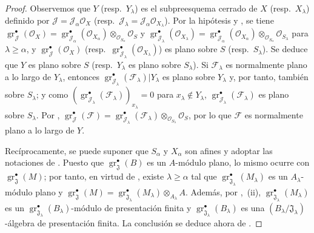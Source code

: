 \begin{proof}
Observemos que $Y$ (resp.\ $Y_\lambda$) es el subpreesquema cerrado de $X$ (resp.\ $X_\lambda$) definido por $\mathcal J=\mathcal J_\alpha\mathcal O_X$ (resp.\ $\mathcal J_\lambda=\mathcal J_\alpha\mathcal O_{X_\lambda}$). Por la hipótesis y , se tiene
$\operatorname{gr}_{\mathcal J}^\bullet(\mathcal O_X)
=\operatorname{gr}_{\mathcal J_\alpha}^\bullet(\mathcal O_{X_\alpha})
 \otimes_{\mathcal O_{S_\alpha}}\mathcal O_S$
y
$\operatorname{gr}_{\mathcal J_\lambda}^\bullet(\mathcal O_{X_\lambda})
=\operatorname{gr}_{\mathcal J_\alpha}^\bullet(\mathcal O_{X_\alpha})
 \otimes_{\mathcal O_{S_\alpha}}\mathcal O_{S_\lambda}$
para $\lambda\geq\alpha$,
y $\operatorname{gr}_{\mathcal J}^\bullet(\mathcal O_X)$ (resp.\ $\operatorname{gr}_{\mathcal J_\lambda}^\bullet(\mathcal O_{X_\lambda})$) es plano sobre $S$ (resp.\ $S_\lambda$). Se deduce que $Y$ es plano sobre $S$ (resp.\ $Y_\lambda$ es plano sobre $S_\lambda$). Si $\mathcal F_\lambda$ es normalmente plano a lo largo de $Y_\lambda$, entonces $\operatorname{gr}_{\mathcal J_\lambda}^\bullet
(\mathcal F_\lambda)|Y_\lambda$ es plano sobre $Y_\lambda$ y, por tanto, también sobre $S_\lambda$; y como
$(\operatorname{gr}_{\mathcal J_\lambda}^\bullet(\mathcal F_\lambda))_{x_\lambda}=0$
para $x_\lambda\notin Y_\lambda$,
$\operatorname{gr}_{\mathcal J_\lambda}^\bullet(\mathcal F_\lambda)$ es plano sobre $S_\lambda$. Por ,
$\operatorname{gr}_{\mathcal J}^\bullet(\mathcal F)
=\operatorname{gr}_{\mathcal J_\lambda}^\bullet(\mathcal F_\lambda)
 \otimes_{\mathcal O_{S_\lambda}}\mathcal O_S$,
por lo que $\mathcal F$ es normalmente plano a lo largo de $Y$.

Recíprocamente, se puede suponer que $S_\alpha$ y $X_\alpha$ son afines y adoptar las notaciones de . Puesto que $\operatorname{gr}_{\mathfrak J}^\bullet(B)$ es un $A$-módulo plano, lo mismo ocurre con $\operatorname{gr}_{\mathfrak J}^\bullet(M)$; por tanto, en virtud de , existe $\lambda\geq\alpha$ tal que $\operatorname{gr}_{\mathfrak J_\lambda}^\bullet(M_\lambda)$ es un $A_\lambda$-módulo plano y
$\operatorname{gr}_{\mathfrak J}^\bullet(M)
=\operatorname{gr}_{\mathfrak J_\lambda}^\bullet(M_\lambda)\otimes_{A_\lambda}A$.
Además, por ,~(ii), $\operatorname{gr}_{\mathfrak J_\lambda}^\bullet(M_\lambda)$ es un $\operatorname{gr}_{\mathfrak J_\lambda}^\bullet(B_\lambda)$-módulo de presentación finita y $\operatorname{gr}_{\mathfrak J_\lambda}^\bullet(B_\lambda)$ es una $(B_\lambda/\mathfrak J_\lambda)$-álgebra de presentación finita. La conclusión se deduce ahora de .
\end{proof}

